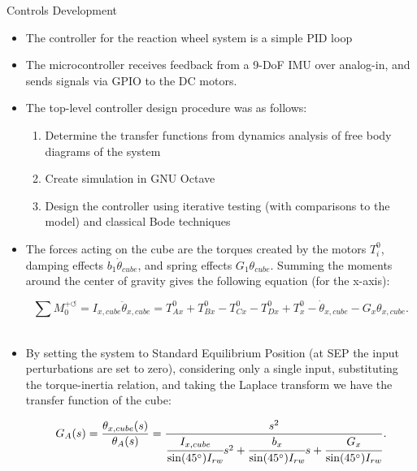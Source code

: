 \documentclass[slidestop,compress]{beamer}
\begin{document}
\begin{frame}[plain]
\begin{block}{\centering Controls Development}
\hspace{1 mm}
\begin{itemize}
\item The controller for the reaction wheel system is a simple PID loop 
\item The microcontroller receives feedback from a 9-DoF IMU over analog-in, and sends signals via GPIO to the DC motors. 
\item The top-level controller design procedure was as follows:
\begin{enumerate}
\item Determine the transfer functions from dynamics analysis of free body diagrams of the system
\item Create simulation in GNU Octave
\item Design the controller using iterative testing (with comparisons to the model) and classical Bode techniques
\end{enumerate}
\item The forces acting on the cube are the torques created by the motors $T_i^0$, damping effects $b_1 \dot{\theta}_{cube}$, and spring effects $G_1 \theta_{cube}$. Summing the moments around the center of gravity gives the following equation (for the x-axis):

\[
\sum M_0^{+ \circlearrowleft} = I_{x,cube} \ddot{\theta}_{x,cube} = T^0_{Ax} + T^0_{Bx} - T^0_{Cx} - T^0_{Dx} + T^0_x - \dot{\theta}_{x,cube} - G_x \theta_{x,cube}.
\] 
\\
\item By setting the system to Standard Equilibrium Position (at SEP the input perturbations are set to zero), considering only a single input, substituting the torque-inertia relation,  and taking the Laplace transform we have the transfer function of the cube:

\[G_A(s)=\frac{\theta_{x,cube}(s)}{\theta_A(s)}=\frac{s^2}{\cfrac{I_{x,cube}}{\sin(45^{\circ}) I_{rw}}s^2 + \cfrac{b_x}{\sin(45^{\circ}) I_{rw}}s + \cfrac{G_x}{\sin(45^{\circ}) I_{rw}}}.
\]
  
\end{itemize}
\end{block}    
\end{frame}
\end{document}
